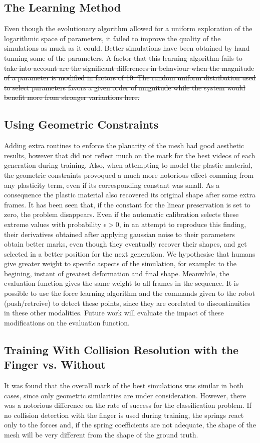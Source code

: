 \documentclass[journal]{IEEEtran}
\newcounter{algorithm}
\begin{document}
\subsection{The Learning Method}
Even though the evolutionary algorithm allowed for a uniform exploration of the logarithmic space of parameters, it failed to improve the quality of the simulations as much as it could.  Better simulations have been obtained by hand tunning some of the parameters.  \sout{A factor that this learning algorithm fails to take into account are the significant differences in behaviour when the magnitude of a parameter is modified in factors of 10.  The random uniform distribution used to select parameters favors a given order of magnitude while the system would benefit more from stronger variantions here.}

\subsection{Using Geometric Constraints}
Adding extra routines to enforce the planarity of the mesh had good aesthetic results, however that did not reflect much on the mark for the best videos of each generation during training.   Also, when attempting to model the plastic material, the geometric constraints provoqued a much more notorious effect comming from any plasticity term, even if its corresponding constant was small.  As a consequence the plastic material also recovered its original shape after some extra frames.  It has been seen that, if the constant for the linear preservation is set to zero, the problem disappears.  Even if the automatic calibration selects these extreme values with probability $\epsilon>0$, in an attempt to reproduce this finding, their derivatives obtained after applying gaussian noise to their parameters obtain better marks, even though they eventually recover their shapes, and get selected in a better position for the next generation.  We hypothesise that humans give greater weight to specific aspects of the simulation, for example: to the begining, instant of greatest deformation and final shape.  Meanwhile, the evaluation function gives the same weight to all frames in the sequence.  It is possible to use the force learning algorithm and the commands given to the robot (push/retreive) to detect these points, since they are corelated to discontinuities in these other modalities.  Future work will evaluate the impact of these modifications on the evaluation function.

\subsection{Training With Collision Resolution with the Finger vs. Without}
It was found that the overall mark of the best simulations was similar in both cases, since only geometric similarities are under consideration.  However, there was a notorious difference on the rate of success for the classification problem.  If no collision detection with the finger is used during training, the springs react only to the forces and, if the spring coefficients are not adequate, the shape of the mesh will be very different from the shape of the ground truth.
\end{document}
